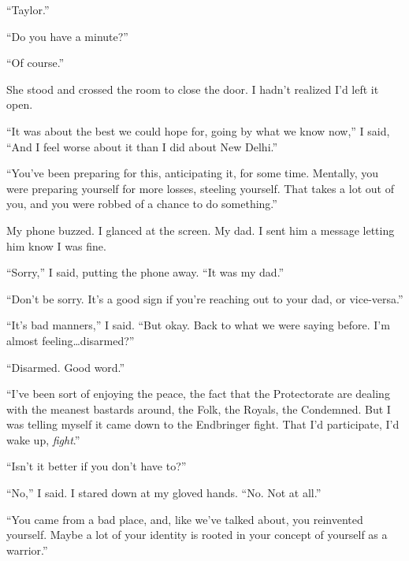 ``Taylor.''



``Do you have a minute?''



``Of course.''



She stood and crossed the room to close the door.  I hadn't realized I'd left it open.



``It was about the best we could hope for, going by what we know now,'' I said, ``And I feel worse about it than I did about New Delhi.''



``You've been preparing for this, anticipating it, for some time.  Mentally, you were preparing yourself for more losses, steeling yourself.  That takes a lot out of you, and you were robbed of a chance to do something.''



My phone buzzed.  I glanced at the screen.  My dad.  I sent him a message letting him know I was fine.



``Sorry,'' I said, putting the phone away.  ``It was my dad.''



``Don't be sorry.  It's a good sign if you're reaching out to your dad, or vice-versa.''



``It's bad manners,'' I said.  ``But okay.  Back to what we were saying before.  I'm almost feeling\ldots disarmed?''



``Disarmed.  Good word.''



``I've been sort of enjoying the peace, the fact that the Protectorate are dealing with the meanest bastards around, the Folk, the Royals, the Condemned.  But I was telling myself it came down to the Endbringer fight.  That I'd participate, I'd wake up, \emph{fight}.''



``Isn't it better if you don't have to?''



``No,'' I said.  I stared down at my gloved hands.  ``No.  Not at all.''



``You came from a bad place, and, like we've talked about, you reinvented yourself.  Maybe a lot of your identity is rooted in your concept of yourself as a warrior.''



